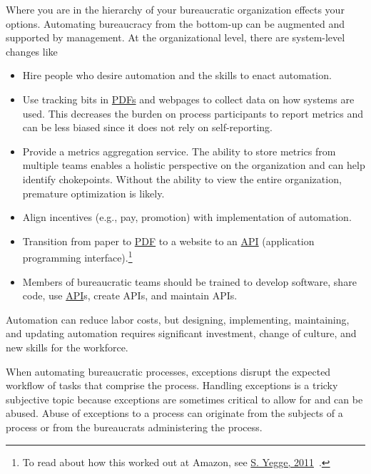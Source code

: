 Where you are in the hierarchy of your bureaucratic organization effects your options. 
Automating bureaucracy from the bottom-up can be augmented and supported by management. 
At the organizational level, there are system-level changes like
\begin{itemize}
    \item Hire people who desire automation and the skills to enact automation.
    \item Use tracking bits in
    \href{https://en.wikipedia.org/wiki/PDF}{PDFs} and webpages to collect data on how systems are used. This decreases the burden on process participants to report metrics and can be less biased since it does not rely on self-reporting.
    \item Provide a metrics aggregation service. The ability to store metrics from multiple teams enables a holistic perspective on the organization and can help identify chokepoints. Without the ability to view the entire organization, premature optimization is likely.
    \item Align incentives (e.g., pay, promotion) with implementation of automation.
    \item Transition from paper to 
    \href{https://en.wikipedia.org/wiki/PDF}{PDF} 
    to a website to an 
    \href{https://en.wikipedia.org/wiki/API}{API} (application programming interface).\footnote{To read about how this worked out at Amazon, see \href{https://gist.github.com/bhpayne/49c8379a3ea880b7cc079fc8d32c87a7}{S. Yegge, 2011}~\cite{2011_Yegge}.}
    \item Members of bureaucratic teams should be trained to develop software, share code, use \href{https://en.wikipedia.org/wiki/API}{API}s, 
    create APIs, and maintain APIs.
\end{itemize}



Automation can reduce labor costs, but designing, implementing, maintaining, and updating automation requires significant investment, change of culture, and new skills for the workforce.  


When automating bureaucratic processes, exceptions disrupt the expected workflow of tasks that comprise the process. Handling exceptions is a tricky subjective topic because exceptions are sometimes critical to allow for and can be abused. Abuse of exceptions to a process can originate from the subjects of a process or from the bureaucrats administering the process.
